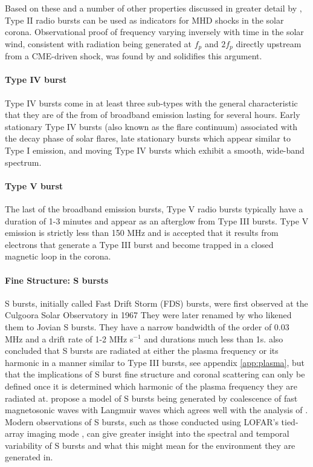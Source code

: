 Based on these and a number of other properties discussed in greater detail by \cite{NelsonandMelrose1985}, Type II radio bursts can be used as indicators for MHD shocks in the solar corona. Observational proof of frequency varying inversely with time in the solar wind, consistent with radiation being generated at $f_p$ and $2f_p$ directly upstream from a CME-driven shock, was found by \cite{Reiner1997} and solidifies this argument.

\paragraph{Type IV burst}
Type IV bursts come in at least three sub-types with the general characteristic that they are of the from of broadband emission lasting for several hours. Early stationary Type IV bursts (also known as the flare continuum) associated with the decay phase of solar flares, late stationary bursts which appear similar to Type I emission, and moving Type IV bursts which exhibit a smooth, wide-band spectrum.
\paragraph{Type V burst}
The last of the broadband emission bursts, Type V radio bursts typically have a duration of 1-3 minutes and appear as an afterglow from Type III bursts. Type V emission is strictly less than 150 MHz and is accepted that it results from electrons that generate a Type III burst and become trapped in a closed magnetic loop in the corona.

\paragraph{Fine Structure: S bursts} 
S bursts, initially called Fast Drift Storm (FDS) bursts, were first observed at the Culgoora Solar Observatory in 1967 \citep{Ellis1969} They were later renamed by \cite{McConnell1980} who likened them to Jovian S bursts. They have a narrow bandwidth of the order of 0.03 MHz and a drift rate of 1-2 MHz s$^{-1}$ and durations much less than 1s. \cite{McConnell1980} also concluded that S bursts are radiated at either the plasma frequency or its harmonic in a manner similar to Type III bursts, see appendix \ref{app:plasma}, but that the implications of S burst fine structure and coronal scattering can only be defined once it is determined which harmonic of the plasma frequency they are radiated at. \cite{Melnik2010} propose a model of S bursts being generated by coalescence of fast magnetosonic waves with Langmuir waves which agrees well with the analysis of \cite{Clarke2019}. Modern observations of S bursts, such as those conducted using LOFAR's tied-array imaging mode \citep{Morosan2015}, can give greater insight into the spectral and temporal variability of S bursts and what this might mean for the environment they are generated in.

